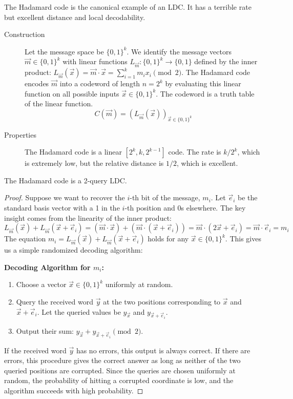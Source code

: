 The Hadamard code is the canonical example of an LDC. It has a terrible rate but excellent distance and local decodability.

\begin{description}
    \item[Construction] Let the message space be $\{0,1\}^k$. We identify the message vectors $\vec{m} \in \{0,1\}^k$ with linear functions $L_{\vec{m}}: \{0,1\}^k \to \{0,1\}$ defined by the inner product: $L_{\vec{m}}(\vec{x}) = \vec{m} \cdot \vec{x} = \sum_{i=1}^k m_i x_i \pmod{2}$. The Hadamard code encodes $\vec{m}$ into a codeword of length $n=2^k$ by evaluating this linear function on all possible inputs $\vec{x} \in \{0,1\}^k$. The codeword is a truth table of the linear function.
    \[ C(\vec{m}) = (L_{\vec{m}}(\vec{x}))_{\vec{x} \in \{0,1\}^k} \]

    \item[Properties] The Hadamard code is a linear $[2^k, k, 2^{k-1}]$ code. The rate is $k/2^k$, which is extremely low, but the relative distance is $1/2$, which is excellent.
\end{description}

\begin{theorem}
The Hadamard code is a 2-query LDC.
\end{theorem}
\begin{proof}
Suppose we want to recover the $i$-th bit of the message, $m_i$. Let $\vec{e}_i$ be the standard basis vector with a 1 in the $i$-th position and 0s elsewhere. The key insight comes from the linearity of the inner product:
\[ L_{\vec{m}}(\vec{x}) + L_{\vec{m}}(\vec{x} + \vec{e}_i) = (\vec{m} \cdot \vec{x}) + (\vec{m} \cdot (\vec{x} + \vec{e}_i)) = \vec{m} \cdot (2\vec{x} + \vec{e}_i) = \vec{m} \cdot \vec{e}_i = m_i \]
The equation $m_i = L_{\vec{m}}(\vec{x}) + L_{\vec{m}}(\vec{x} + \vec{e}_i)$ holds for any $\vec{x} \in \{0,1\}^k$. This gives us a simple randomized decoding algorithm:

\textbf{Decoding Algorithm for $m_i$:}
\begin{enumerate}
    \item Choose a vector $\vec{x} \in \{0,1\}^k$ uniformly at random.
    \item Query the received word $\vec{y}$ at the two positions corresponding to $\vec{x}$ and $\vec{x}+\vec{e}_i$. Let the queried values be $y_{\vec{x}}$ and $y_{\vec{x}+\vec{e}_i}$.
    \item Output their sum: $y_{\vec{x}} + y_{\vec{x}+\vec{e}_i} \pmod{2}$.
\end{enumerate}
If the received word $\vec{y}$ has no errors, this output is always correct. If there are errors, this procedure gives the correct answer as long as neither of the two queried positions are corrupted. Since the queries are chosen uniformly at random, the probability of hitting a corrupted coordinate is low, and the algorithm succeeds with high probability.
\end{proof}

